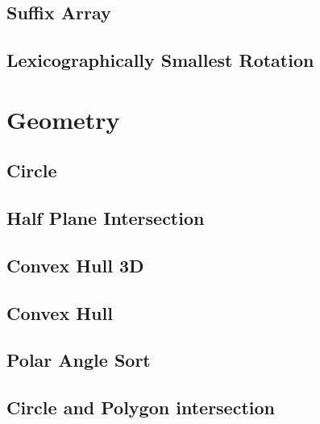 \documentclass[a4paper,10pt,twocolumn,oneside]{article}
\begin{document}
\subsection{Suffix Array}


\subsection{Lexicographically Smallest Rotation}


\section{Geometry}
\subsection{Circle}


\subsection{Half Plane Intersection}


%

\subsection{Convex Hull 3D}


\subsection{Convex Hull}


\subsection{Polar Angle Sort}


\subsection{Circle and Polygon intersection}

\end{document}
